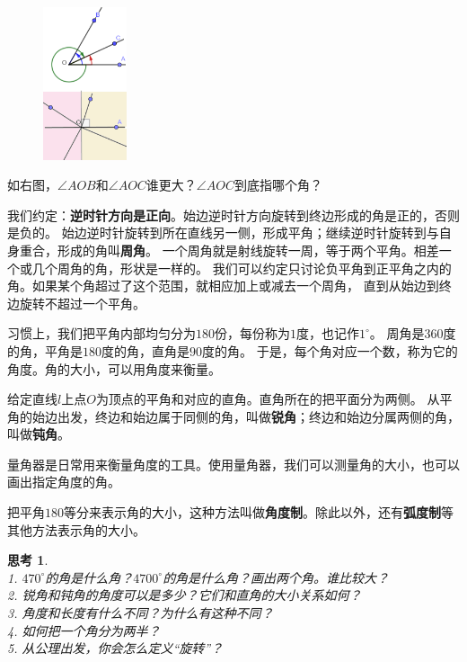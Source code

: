 \documentclass[12pt,UTF8]{ctexbook}
\newtheorem{sk}{思考}[section]
\begin{document}
\begin{figure} %
    \vspace{-10pt}
    \includegraphics[width=0.22\textwidth]{角度1.png}
\end{figure}

如右图，$\angle AOB$和$\angle AOC$谁更大？$\angle AOC$到底指哪个角？

我们约定：\textbf{逆时针方向是正向}。始边逆时针方向旋转到终边形成的角是正的，否则是负的。
始边逆时针旋转到所在直线另一侧，形成平角；继续逆时针旋转到与自身重合，形成的角叫\textbf{周角}。
一个周角就是射线旋转一周，等于两个平角。相差一个或几个周角的角，形状是一样的。
我们可以约定只讨论负平角到正平角之内的角。如果某个角超过了这个范围，就相应加上或减去一个周角，
直到从始边到终边旋转不超过一个平角。

习惯上，我们把平角内部均匀分为$180$份，每份称为$1$度，也记作$1^\circ$。
周角是$360$度的角，平角是$180$度的角，直角是$90$度的角。
于是，每个角对应一个数，称为它的角度。角的大小，可以用角度来衡量。

给定直线$l$上点$O$为顶点的平角和对应的直角。直角所在的把平面分为两侧。
从平角的始边出发，终边和始边属于同侧的角，叫做\textbf{锐角}；终边和始边分属两侧的角，叫做\textbf{钝角}。

量角器是日常用来衡量角度的工具。使用量角器，我们可以测量角的大小，也可以画出指定角度的角。

把平角$180$等分来表示角的大小，这种方法叫做\textbf{角度制}。除此以外，还有\textbf{弧度制}等其他方法表示角的大小。
\begin{sk}\label{sk:0-2-0}
    \mbox{}\\
    1. $470^\circ$的角是什么角？$4700^\circ$的角是什么角？画出两个角。谁比较大？\\
    2. 锐角和钝角的角度可以是多少？它们和直角的大小关系如何？\\
    3. 角度和长度有什么不同？为什么有这种不同？\\
    4. 如何把一个角分为两半？\\
    5. 从公理出发，你会怎么定义“旋转”？
\end{sk}
\end{document}
